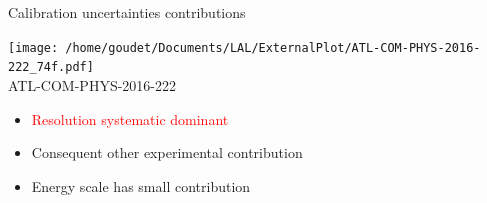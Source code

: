 \begin{frame}{Calibration uncertainties contributions}
  \begin{minipage}{0.49\linewidth}
    \texttt{[image: /home/goudet/Documents/LAL/ExternalPlot/ATL-COM-PHYS-2016-222\_74f.pdf]}\\
    \centering
    ATL-COM-PHYS-2016-222
  \end{minipage}
  \begin{minipage}{0.49\linewidth}
    \begin{itemize}
    \item \textcolor{red}{Resolution systematic dominant}
    \item Consequent other experimental contribution
    \item Energy scale has small contribution
    \end{itemize}
  \end{minipage}
\end{frame}

